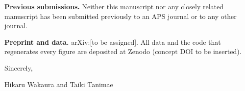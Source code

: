\documentclass[11pt]{article}
\begin{document}
\medskip
\noindent\textbf{Previous submissions.} Neither this manuscript nor any closely related manuscript has been submitted previously to an APS journal or to any other journal.

\medskip
\noindent\textbf{Preprint and data.} arXiv:[to be assigned]. All data and the code that regenerates every figure are deposited at Zenodo (concept DOI to be inserted).

\medskip
\noindent Sincerely,

\medskip
\noindent Hikaru Wakaura and Taiki Tanimae
\end{document}
